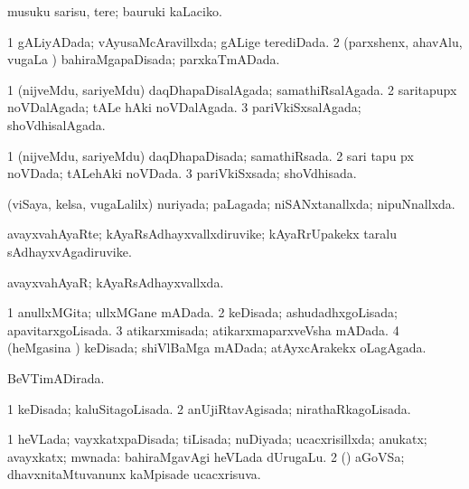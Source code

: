 {{\noindent
\gl{\akirx}
\expl{}
\bmng
musuku sarisu, tere; bauruki kaLaciko. 
\emng
\eentry

\bentry
{} 
\gl{\gu}
\expl{}
\bmng
\bnum
\num{1} gALiyADada; vAyusaMcAravillxda; gALige terediDada. 
\num{2} (parxshenx, ahavAlu, \mo vugaLa \vi) bahiraMgapaDisada; parxkaTmADada. 
\enum
\emng
\eentry

\bentry
{} 
\gl{\gu}
\expl{}
\bmng
\bnum
\num{1} (nijveMdu, sariyeMdu) daqDhapaDisalAgada; samathiRsalAgada. 
\num{2} saritapupx noVDalAgada; tALe hAki noVDalAgada. 
\num{3} pariVkiSxsalAgada; shoVdhisalAgada. 
\enum
\emng
\eentry

\bentry
{} 
\gl{\gu}
\expl{}
\bmng
\bnum
\num{1} (nijveMdu, sariyeMdu) daqDhapaDisada; samathiRsada. 
\num{2} sari tapu px noVDada; tALehAki noVDada. 
\num{3} pariVkiSxsada; shoVdhisada. 
\enum
\emng
\eentry

\bentry
{} 
\gl{\gu}
\expl{}
\bmng
(viSaya, kelsa, \mo vugaLalilx) nuriyada; paLagada; niSANxtanallxda; nipuNnallxda. 
\emng
\eentry

\bentry
{} 
\gl{\nA}
\expl{}
\bmng
avayxvahAyaRte; kAyaRsAdhayxvallxdiruvike; kAyaRrUpakekx taralu sAdhayxvAgadiruvike. 
\emng
\eentry

\bentry
{} 
\gl{\gu}
\expl{}
\bmng
avayxvahAyaR; kAyaRsAdhayxvallxda. 
\emng
\eentry

\bentry
{} 
\gl{\gu}
\expl{}
\bmng
\bnum
\num{1} anullxMGita; ullxMGane mADada. 
\num{2} keDisada; ashudadhxgoLisada; apavitarxgoLisada. 
\num{3} atikarxmisada; atikarxmaparxveVsha mADada. 
\num{4} (heMgasina \vi) keDisada; shiVlBaMga mADada; atAyxcArakekx oLagAgada. 
\enum
\emng
\eentry

\bentry
{} 
\gl{\gu}
\expl{}
\bmng
BeVTimADirada. 
\emng
\eentry

\bentry
{} 
\gl{\gu}
\expl{}
\bmng
\bnum
\num{1} keDisada; kaluSitagoLisada. 
\num{2} anUjiRtavAgisada; nirathaRkagoLisada. 
\enum
\emng
\eentry

\bentry
{} 
\gl{\gu}
\expl{}
\bmng
\bnum
\num{1} heVLada; vayxkatxpaDisada; tiLisada; nuDiyada; ucacxrisillxda; anukatx; avayxkatx; mwnada:  bahiraMgavAgi heVLada dUrugaLu. 
\num{2} (\BAshA) aGoVSa; dhavxnitaMtuvanunx kaMpisade ucacxrisuva. 
\enum
\emng
\eentry

}}
